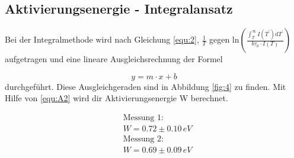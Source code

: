 \subsection{Aktivierungsenergie - Integralansatz}
\label{sec:int}

Bei der Integralmethode wird nach Gleichung \ref{equ:2}, $\frac{1}{T}$ gegen $\text{ln} \left( \frac{\int_{T}^{\infty} I(T^{'}) \text{d}T^{'}}{b \tau_0 \cdot I(T)} \right)$ aufgetragen und eine lineare Ausgleichsrechnung der Formel

\begin{equation}
    y = m \cdot x + b
\end{equation}
durchgeführt.
Diese Ausgleichgeraden sind in Abbildung \ref{fig:4} zu finden.
Mit Hilfe von \ref{equ:A2} wird dir Aktivierungsenergie W berechnet.

\begin{align*}
    &\text{Messung 1:}\\
    & W = 0.72 \pm 0.10 \,eV \\
    &\text{Messung 2:}\\
    & W = 0.69 \pm 0.09 \,eV  \\
\end{align*}

